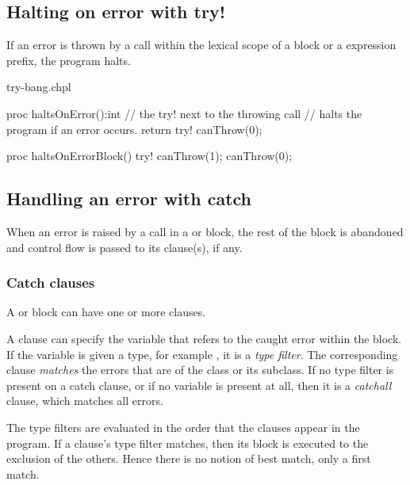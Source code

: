 \subsection{Halting on error with try!}
\label{Halting_on_error_with_try_bang}

If an error is thrown by a call within the lexical scope of a 
block or a  expression prefix, the program halts.

\begin{chapelexample}{try-bang.chpl}
\begin{chapel}
proc haltsOnError():int {
  // the try! next to the throwing call
  // halts the program if an error occurs.
  return try! canThrow(0);
}

proc haltsOnErrorBlock() {
  try! {
    canThrow(1);
    canThrow(0);
  }
}
\end{chapel}
\end{chapelexample}

\subsection{Handling an error with catch}
\label{Handling_an_error_with_catch}

When an error is raised by a call in a  or  block,
the rest of the block is abandoned and control flow is passed
to its  clause(s), if any.

\subsubsection{Catch clauses}
\label{Catch_clauses}

A  or  block can have one or more  clauses.

A  clause can specify the variable that refers to the caught
error within the  block. If the variable is given a type,
for example , it is a \emph{type filter}.
The corresponding  clause \emph{matches} the errors
that are of the class  or its subclass. If no type
filter is present on a catch clause, or if no variable is present at
all, then it is a \emph{catchall} clause, which matches all errors.

The type filters are evaluated in the order that the  clauses
appear in the program. If a  clause's type filter matches,
then its block is executed to the exclusion of the others. Hence there
is no notion of best match, only a first match.

